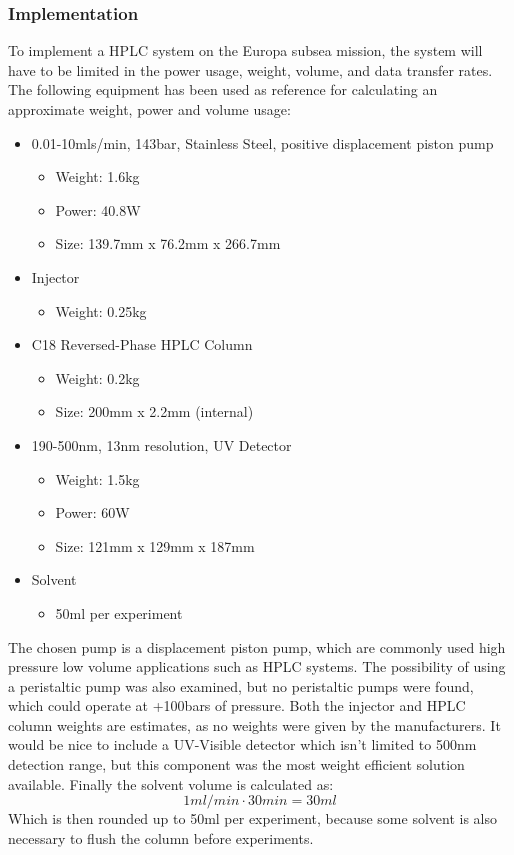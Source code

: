 \subsubsection{Implementation}
To implement a HPLC system on the Europa subsea mission, the system will have to be limited in the power usage, weight, volume, and data transfer rates. The following equipment has been used as reference for calculating an approximate weight, power and volume usage:
\begin{itemize}
    \item 0.01-10mls/min, 143bar, Stainless Steel, positive displacement piston pump 
    \begin{itemize}
        \item Weight: 1.6kg
        \item Power: 40.8W
        \item Size: 139.7mm x 76.2mm x 266.7mm
    \end{itemize}
    \item Injector 
    \begin{itemize}
        \item Weight: 0.25kg
    \end{itemize}
    \item C18 Reversed-Phase HPLC Column 
    \begin{itemize}
        \item Weight: 0.2kg
        \item Size: 200mm x 2.2mm (internal)
    \end{itemize}
    \item 190-500nm, 13nm resolution, UV Detector 
    \begin{itemize}
        \item Weight: 1.5kg
        \item Power: 60W
        \item Size: 121mm x 129mm x 187mm
    \end{itemize}
    \item Solvent
    \begin{itemize}
        \item 50ml per experiment
    \end{itemize}
\end{itemize}
The chosen pump is a displacement piston pump, which are commonly used high pressure low volume applications such as HPLC systems. The possibility of using a peristaltic pump was also examined, but no peristaltic pumps were found, which could operate at +100bars of pressure. Both the injector and HPLC column weights are estimates, as no weights were given by the manufacturers. It would be nice to include a UV-Visible detector which isn’t limited to 500nm detection range, but this component was the most weight efficient solution available. Finally the solvent volume is calculated as:
\begin{equation}
    1ml/min \cdot 30min = 30ml    
\end{equation}
Which is then rounded up to 50ml per experiment, because some solvent is also necessary to flush the column before experiments.

